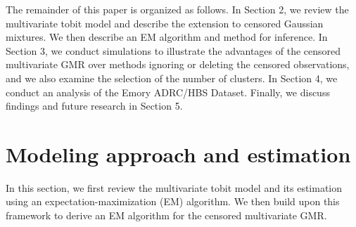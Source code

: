 \documentclass{interact}
\theoremstyle{plain}
\theoremstyle{definition}
\theoremstyle{remark}
\begin{document}
The remainder of this paper is organized as follows. In Section 2, we review the multivariate tobit model and describe the extension to censored Gaussian mixtures. We then describe an EM algorithm and method for inference. In  Section 3, we conduct simulations to illustrate the advantages of the censored multivariate GMR over methods ignoring or deleting the censored observations, and we also examine the selection of the number of clusters. In Section 4, we conduct an analysis of the Emory ADRC/HBS Dataset. Finally, we discuss findings and future research in Section 5.

\section{Modeling approach and estimation}
\label{sec:model}
In this section, we first review the multivariate tobit model and its estimation using an expectation-maximization (EM) algorithm. We then build upon this framework to derive an EM algorithm for the censored multivariate GMR.
\end{document}
